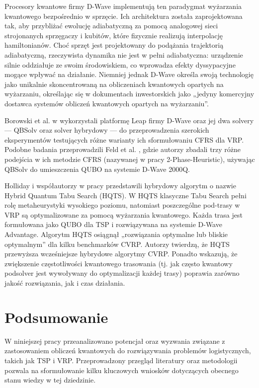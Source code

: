 Procesory kwantowe firmy D-Wave implementują ten paradygmat wyżarzania kwantowego bezpośrednio w sprzęcie. Ich architektura została zaprojektowana tak, aby przybliżać ewolucję adiabatyczną za pomocą analogowej sieci strojonanych sprzęgaczy i kubitów, które fizycznie realizują interpolację hamiltonianów. Choć sprzęt jest projektowany do podążania trajektorią adiabatyczną, rzeczywista dynamika nie jest w pełni adiabatyczna: urządzenie silnie oddziałuje ze swoim środowiskiem, co wprowadza efekty dyssypacyjne mogące wpływać na działanie. Niemniej jednak D-Wave określa swoją technologię jako unikalnie skoncentrowaną na obliczeniach kwantowych opartych na wyżarzaniu, określając się w dokumentach inwestorskich jako „jedyny komercyjny dostawca systemów obliczeń kwantowych opartych na wyżarzaniu”.

Borowski et al. w \cite{Borowski2020} wykorzystali platformę Leap firmy D-Wave oraz jej dwa solvery — QBSolv oraz solver hybrydowy — do przeprowadzenia szerokich eksperymentów testujących różne warianty ich sformułowaniu CFRS dla VRP. Podobne badania przeprowadzili Feld et al. \cite{Feld_2019}, gdzie autorzy zbadali trzy różne podejścia w ich metodzie CFRS (nazywanej w pracy 2-Phase-Heuristic), używając QBSolv do umieszczenia QUBO na systemie D-Wave 2000Q.

Holliday i współautorzy w pracy \cite{holliday2025advancedhybridquantumtabu} przedstawili hybrydowy algorytm o nazwie Hybrid Quantum Tabu Search (HQTS). W HQTS klasyczne Tabu Search pełni rolę metaheurystyki wysokiego poziomu, natomiast poszczególne pod-trasy w VRP są optymalizowane za pomocą wyżarzania kwantowego. Każda trasa jest formułowana jako QUBO dla TSP i rozwiązywana na systemie D-Wave Advantage. Algorytm HQTS osiągnął „rozwiązania optymalne lub bliskie optymalnym” dla kilku benchmarków CVRP. Autorzy twierdzą, że HQTS przewyższa wcześniejsze hybrydowe algorytmy CVRP. Ponadto wskazują, że zwiększenie częstotliwości kwantowego trasowania (tj. jak często kwantowy podsolver jest wywoływany do optymalizacji każdej trasy) poprawia zarówno jakość rozwiązania, jak i czas działania.

\section{Podsumowanie}
W niniejszej pracy przeanalizowano potencjał oraz wyzwania związane z zastosowaniem obliczeń kwantowych do rozwiązywania problemów logistycznych, takich jak TSP i VRP. Przeprowadzony przegląd literatury oraz metodologii pozwala na sformułowanie kilku kluczowych wniosków dotyczących obecnego stanu wiedzy w tej dziedzinie.

